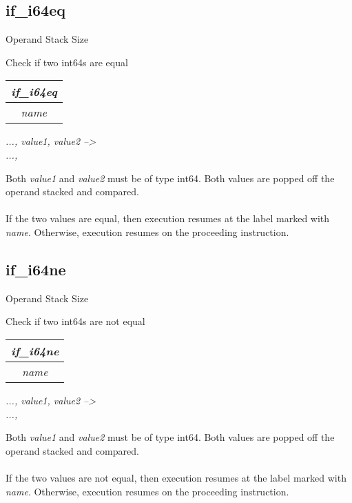 \documentclass[12pt]{article}
\begin{document}
		\newpage
		\subsection*{if\_i64eq}
			\begin{labeling}{Operand Stack Size}
				\item [\textbf{Operation}] Check if two int64s are equal 
				\item [\textbf{Format}] \begin{tabular}{| c |} \hline \textit{if\_i64eq} \\ \hline \textit{name} \\ \hline \end{tabular}
				\item [\textbf{Operand Stack}] \textit{..., value1, value2 --\textgreater} \\
										\textit{..., }
				\item [\textbf{Description}] Both \textit{value1} and \textit{value2} must be of type int64. Both values are popped off the operand stacked and compared. \\ \\
				If the two values are equal, then execution resumes at the label marked with \textit{name}. Otherwise, execution resumes on the proceeding instruction. 
			\end{labeling}	
			
		\newpage
		\subsection*{if\_i64ne}
			\begin{labeling}{Operand Stack Size}
				\item [\textbf{Operation}] Check if two int64s are not equal
				\item [\textbf{Format}] \begin{tabular}{| c |} \hline \textit{if\_i64ne} \\ \hline \textit{name} \\ \hline \end{tabular}
				\item [\textbf{Operand Stack}] \textit{..., value1, value2 --\textgreater} \\
										\textit{..., }
				\item [\textbf{Description}] Both \textit{value1} and \textit{value2} must be of type int64. Both values are popped off the operand stacked and compared. \\ \\
				If the two values are not equal, then execution resumes at the label marked with \textit{name}. Otherwise, execution resumes on the proceeding instruction. 
			\end{labeling}	
		\newpage
		
\end{document}
